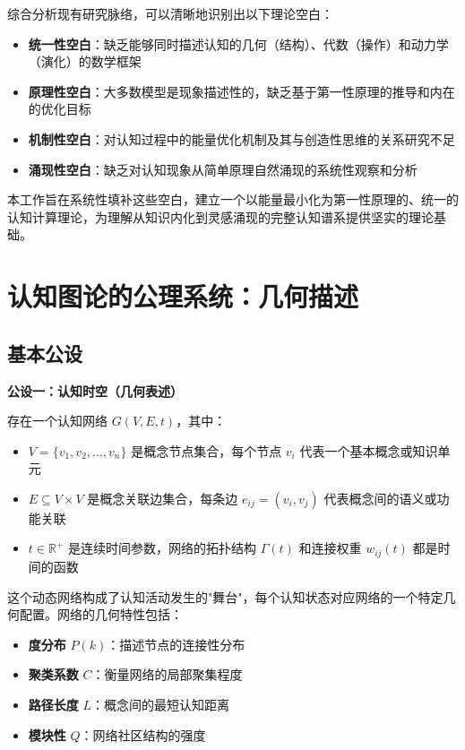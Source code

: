 \documentclass[12pt,a4paper]{article}
\begin{document}
综合分析现有研究脉络，可以清晰地识别出以下理论空白：
\begin{itemize}
\item \textbf{统一性空白}：缺乏能够同时描述认知的几何（结构）、代数（操作）和动力学（演化）的数学框架
\item \textbf{原理性空白}：大多数模型是现象描述性的，缺乏基于第一性原理的推导和内在的优化目标
\item \textbf{机制性空白}：对认知过程中的能量优化机制及其与创造性思维的关系研究不足
\item \textbf{涌现性空白}：缺乏对认知现象从简单原理自然涌现的系统性观察和分析
\end{itemize}

本工作旨在系统性填补这些空白，建立一个以能量最小化为第一性原理的、统一的认知计算理论，为理解从知识内化到灵感涌现的完整认知谱系提供坚实的理论基础。

\section{认知图论的公理系统：几何描述}

\subsection{基本公设}

\textbf{公设一：认知时空（几何表述）}

存在一个认知网络 $G(V,E,t)$，其中：
\begin{itemize}
\item $V = \{v_1, v_2, \ldots, v_n\}$ 是概念节点集合，每个节点 $v_i$ 代表一个基本概念或知识单元
\item $E \subseteq V \times V$ 是概念关联边集合，每条边 $e_{ij} = (v_i, v_j)$ 代表概念间的语义或功能关联
\item $t \in \mathbb{R}^+$ 是连续时间参数，网络的拓扑结构 $\Gamma(t)$ 和连接权重 $w_{ij}(t)$ 都是时间的函数
\end{itemize}

这个动态网络构成了认知活动发生的"舞台"，每个认知状态对应网络的一个特定几何配置。网络的几何特性包括：
\begin{itemize}
\item \textbf{度分布} $P(k)$：描述节点的连接性分布
\item \textbf{聚类系数} $C$：衡量网络的局部聚集程度
\item \textbf{路径长度} $L$：概念间的最短认知距离
\item \textbf{模块性} $Q$：网络社区结构的强度
\end{itemize}
\end{document}

